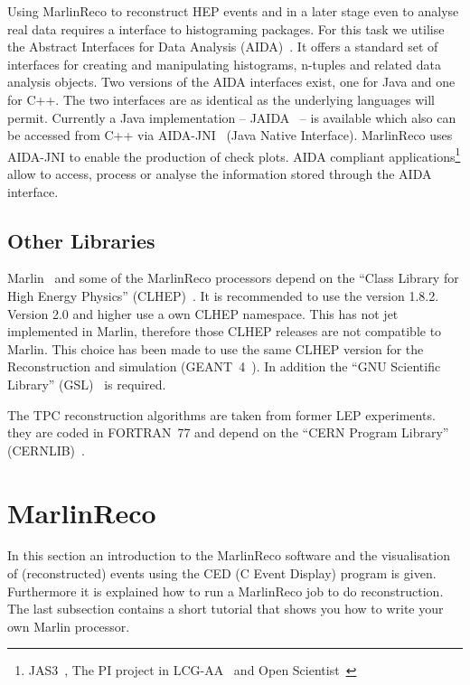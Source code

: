 Using MarlinReco to reconstruct HEP events and in a later stage even to
analyse real data requires a interface to histograming packages. 
For this task we utilise the Abstract Interfaces for Data Analysis
(AIDA)~\cite{ref_aida}. It offers a standard set of interfaces for creating 
and manipulating histograms, n-tuples and related data analysis objects.
Two versions of the AIDA interfaces exist, one for Java and
one for C++. The two interfaces are as identical as the underlying
languages will permit. Currently a Java implementation -- 
JAIDA~\cite{ref_jaida} -- is available which also can be accessed from C++ 
via AIDA-JNI~\cite{ref_aidajni} (Java Native Interface). 
MarlinReco uses AIDA-JNI to enable the production of check plots. 
AIDA compliant applications\footnote{ 
      JAS3~\cite{ref_jas}, The PI project in LCG-AA~\cite{ref_pi} and 
      Open Scientist~\cite{ref_OS}} 
allow to access, process or analyse the information
stored through the AIDA interface. 

\subsection{Other Libraries} \label{sec:otherlibs}

Marlin~\cite{ref_marlin} and some of the MarlinReco processors depend on the
``Class Library for High Energy Physics'' (CLHEP)~\cite{ref_clhep}. 
It is recommended to use the version 1.8.2. Version 2.0 and higher use a 
own CLHEP namespace. This has not jet implemented in Marlin, therefore those
CLHEP releases are not compatible to Marlin. This choice has been 
made to use the same CLHEP version for the Reconstruction and simulation 
(GEANT~4~\cite{ref_geant4}). In addition the ``GNU Scientific Library'' 
(GSL)~\cite{ref_gsl} is required. 

The TPC reconstruction algorithms are taken from former LEP experiments.  
they are coded in FORTRAN~77 and depend on the ``CERN Program Library'' 
(CERNLIB)~\cite{ref_cernlib}. 

\section{MarlinReco}

In this section an introduction to the MarlinReco software and the
visualisation of (reconstructed) events using the 
CED (C Event Display) program is given. Furthermore it is explained how to 
run a MarlinReco job to do reconstruction. The last subsection 
contains a short tutorial that shows you how to write your own Marlin 
processor. 

